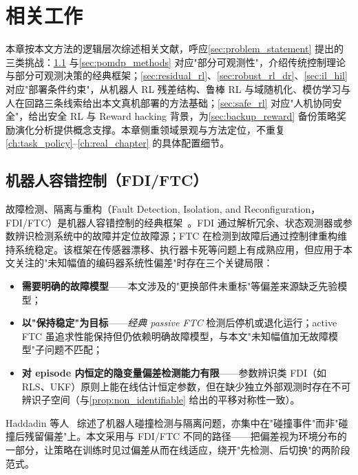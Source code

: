 
\chapter{相关工作}\label{ch:related_work}

本章按本文方法的逻辑层次综述相关文献，呼应\cref{sec:problem_statement} 提出的三类挑战：\cref{sec:ftc} 与\cref{sec:pomdp_methods} 对应"部分可观测性"，介绍传统控制理论与部分可观测决策的经典框架；\cref{sec:residual_rl}、\cref{sec:robust_rl_dr}、\cref{sec:il_hil} 对应"部署条件约束"，从机器人 RL 残差结构、鲁棒 RL 与域随机化、模仿学习与人在回路三条线索给出本文真机部署的方法基础；\cref{sec:safe_rl} 对应"人机协同安全"，给出安全 RL 与 Reward hacking 背景，为\cref{sec:backup_reward} 备份策略奖励演化分析提供概念支撑。本章侧重领域景观与方法定位，不重复\cref{ch:task_policy}–\cref{ch:real_chapter} 的具体配置细节。

\section{机器人容错控制（FDI/FTC）}\label{sec:ftc}

故障检测、隔离与重构（Fault Detection, Isolation, and Reconfiguration，FDI/FTC）是机器人容错控制的经典框架~\cite{blanke2016diagnosis}。FDI 通过解析冗余、状态观测器或参数辨识检测系统中的故障并定位故障源；FTC 在检测到故障后通过控制律重构维持系统稳定。该框架在传感器漂移、执行器卡死等问题上有成熟应用，但应用于本文关注的"未知幅值的编码器系统性偏差"时存在三个关键局限：

\begin{itemize}
  \item \textbf{需要明确的故障模型}——本文涉及的"更换部件未重标"等偏差来源缺乏先验模型；
  \item \textbf{以"保持稳定"为目标}——\emph{经典 passive FTC} 检测后停机或退化运行；active FTC 虽追求性能保持但仍依赖明确故障模型，与本文"未知幅值加无故障模型"子问题不匹配；
  \item \textbf{对 episode 内恒定的隐变量偏差检测能力有限}——参数辨识类 FDI（如 RLS、UKF）原则上能在线估计恒定参数，但在缺少独立外部观测时存在不可辨识子空间（与\cref{prop:non_identifiable} 给出的平移对称性一致）。
\end{itemize}

\noindent Haddadin 等人~\cite{haddadin2017robot} 综述了机器人碰撞检测与隔离问题，亦集中在"碰撞事件"而非"碰撞后残留偏差"上。本文采用与 FDI/FTC 不同的路径——把偏差视为环境分布的一部分，让策略在训练时见过偏差从而在线适应，绕开"先检测、后切换"的两阶段范式。

